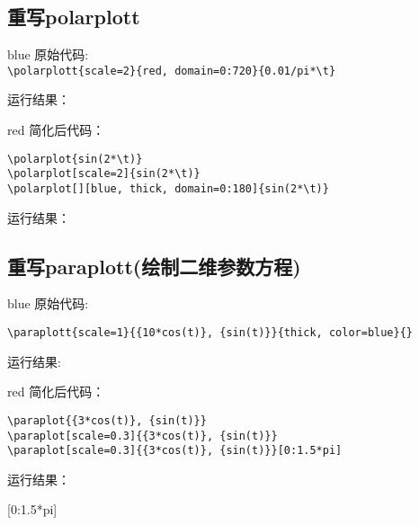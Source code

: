 \documentclass[fontset=windows, 12pt]{article}
\begin{document}
\subsection{重写polarplott}
\begin{formal}{blue}
    原始代码:\\
    \verb |\polarplott{scale=2}{red, domain=0:720}{0.01/pi*\t}|

    \noindent 运行结果：
    \begin{center}
    \end{center}
\end{formal}

\begin{formal}{red}
简化后代码：
\begin{verbatim}
\polarplot{sin(2*\t)}
\polarplot[scale=2]{sin(2*\t)}
\polarplot[][blue, thick, domain=0:180]{sin(2*\t)}
\end{verbatim}
运行结果：
    \begin{center}
    \end{center}
\end{formal}

\newpage
\subsection{重写paraplott(绘制二维参数方程)}
\begin{formal}{blue}
    原始代码:
\begin{verbatim}
\paraplott{scale=1}{{10*cos(t)}, {sin(t)}}{thick, color=blue}{}    
\end{verbatim}

    \noindent 运行结果:
    \begin{center}
    \end{center}
\end{formal}
\begin{formal}{red}
    简化后代码：
\begin{verbatim}
\paraplot{{3*cos(t)}, {sin(t)}}
\paraplot[scale=0.3]{{3*cos(t)}, {sin(t)}}
\paraplot[scale=0.3]{{3*cos(t)}, {sin(t)}}[0:1.5*pi]
\end{verbatim}
    \noindent 运行结果：
    \begin{center}
        [0:1.5*pi]
    \end{center}
\end{formal}
\end{document}
